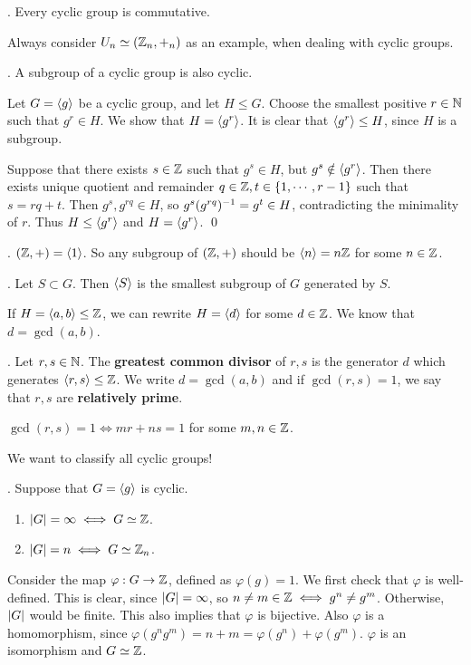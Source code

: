 
\thm. Every cyclic group is commutative.

Always consider \(U_n \simeq (\mathbb{Z}_n, +_n)\) as an example, when dealing with cyclic groups.

\thm. A subgroup of a cyclic group is also cyclic.

\pf Let \(G = \left\langle g \right\rangle\) be a cyclic group, and let \(H \leq G\). Choose the smallest positive \(r \in \mathbb{N}\) such that \(g^r \in H\). We show that \(H = \left\langle g^r \right\rangle\). It is clear that \(\left\langle g^r \right\rangle \leq H\), since \(H\) is a subgroup.

Suppose that there exists \(s \in \mathbb{Z}\) such that \(g^s \in H\), but \(g^s \notin \left\langle g^r \right\rangle\). Then there exists unique quotient and remainder \(q \in \mathbb{Z}, t \in \{1, \cdots, r - 1\}\) such that \(s = rq + t\). Then \(g^s, g^{rq} \in H\), so \(g^s(g^{rq})^{-1} = g^t \in H\), contradicting the minimality of \(r\). Thus \(H \leq \left\langle g^r \right\rangle\) and \(H = \left\langle g^r \right\rangle\). \qed

\ex. \((\mathbb{Z}, +) = \left\langle 1 \right\rangle\). So any subgroup of \((\mathbb{Z}, +)\) should be \(\left\langle n \right\rangle = n\mathbb{Z}\) for some \(n \in \mathbb{Z}\).

. Let \(S \subset G\). Then \(\left\langle S \right\rangle\) is the smallest subgroup of \(G\) generated by \(S\).

If \(H = \left\langle a, b \right\rangle \leq \mathbb{Z}\), we can rewrite \(H = \left\langle d \right\rangle\) for some \(d \in \mathbb{Z}\). We know that \(d = \gcd(a, b)\).

.  Let \(r, s \in \mathbb{N}\). The \textbf{greatest common divisor} of \(r, s\) is the generator \(d\) which generates \(\left\langle r, s \right\rangle \leq \mathbb{Z}\). We write \(d = \gcd(a, b)\) and if \(\gcd(r, s) = 1\), we say that \(r, s\) are \textbf{relatively prime}.

\rmk \(\gcd(r, s) = 1 \iff mr + ns = 1\) for some \(m, n \in \mathbb{Z}\).

We want to classify all cyclic groups!

\thm.  Suppose that \(G = \left\langle g \right\rangle\) is cyclic.
\begin{enumerate}
    \item \(\left| G \right| = \infty \iff G \simeq \mathbb{Z}\).
    \item \(\left| G \right| = n \iff G \simeq \mathbb{Z}_n\).
\end{enumerate}

\pf {} Consider the map \(\varphi: G \rightarrow \mathbb{Z}\), defined as \(\varphi(g) = 1\). We first check that \(\varphi\) is well-defined. This is clear, since \(\left| G \right| = \infty\), so \(n \neq m \in \mathbb{Z} \iff g^n \neq g^m\). Otherwise, \(\left| G \right|\) would be finite. This also implies that \(\varphi\) is bijective. Also \(\varphi\) is a homomorphism, since \(\varphi(g^n g^m) = n + m = \varphi(g^n) + \varphi(g^m)\). \(\varphi\) is an isomorphism and \(G \simeq \mathbb{Z}\).

